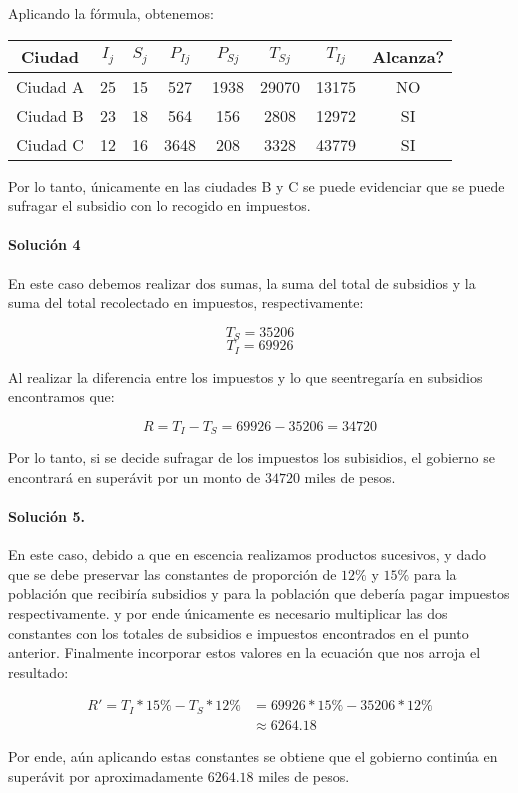 \documentclass{article}
\begin{document}
Aplicando la fórmula, obtenemos:

\begin{center}
	\begin{tabular}{ | c | c | c | c | c | c | c | c | }
		\hline
		\textbf{Ciudad} & \textbf{$I_j$} & \textbf{$S_j$} & \textbf{$P_{Ij}$} & \textbf{$P_{Sj}$} & \textbf{$T_{Sj}$} & \textbf{$T_{Ij}$} & \textbf{Alcanza?}\\
		\hline
		Ciudad A & 25 & 15 & 527 & 1938 & 29070 & 13175 & NO \\
		\hline
		Ciudad B & 23 & 18 & 564 & 156 & 2808 & 12972 & SI \\
		\hline
		Ciudad C & 12 & 16 & 3648 & 208 & 3328 & 43779 & SI \\
		\hline
	\end{tabular}
\end{center}

Por lo tanto, únicamente en las ciudades B y C se puede evidenciar que se puede sufragar el subsidio con lo recogido en impuestos.

\paragraph{Solución 4} En este caso debemos realizar dos sumas, la suma del total de subsidios y la suma del total recolectado en impuestos, respectivamente:

$$T_S = 35206$$
$$T_I = 69926$$

Al realizar la diferencia entre los impuestos y lo que seentregaría en subsidios encontramos que:

$$R = T_I - T_S = 69926 - 35206 = 34720$$

Por lo tanto, si se decide sufragar de los impuestos los subisidios, el gobierno se encontrará en superávit por un monto de $34720$ miles de pesos.

\paragraph{Solución 5.} En este caso, debido a que en escencia realizamos productos sucesivos, y dado que se debe preservar las constantes de proporción de $12\%$ y $15\%$ para la población que recibiría subsidios y para la población que debería pagar impuestos respectivamente. y por ende únicamente es necesario multiplicar las dos constantes con los totales de subsidios e impuestos encontrados en el punto anterior. Finalmente incorporar estos valores en la ecuación que nos arroja el resultado:

\begin{align*}
	R' = T_{I} * 15\%  - T_{S} * 12\% &= 69926*15\% - 35206 * 12\%\\
	&\approx 6264.18 
\end{align*}

Por ende, aún aplicando estas constantes se obtiene que el gobierno continúa en superávit por aproximadamente $6264.18$ miles de pesos.
\end{document}
